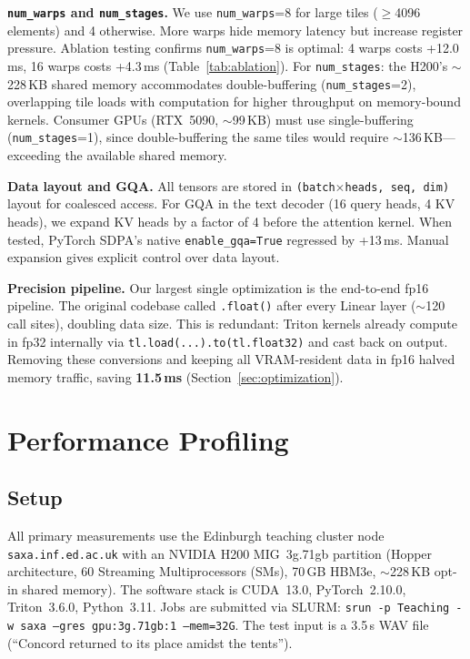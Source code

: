 \documentclass{article}
\begin{document}
\textbf{\texttt{num\_warps} and \texttt{num\_stages}.}
We use \texttt{num\_warps}=8 for large tiles ($\geq$4096 elements) and 4 otherwise.  More warps hide memory latency but increase register pressure.
Ablation testing confirms \texttt{num\_warps}=8 is optimal: 4 warps costs +12.0\,ms, 16 warps costs +4.3\,ms (Table~\ref{tab:ablation}).
For \texttt{num\_stages}: the H200's $\sim$228\,KB shared memory accommodates double-buffering (\texttt{num\_stages}=2), overlapping tile loads with computation for higher throughput on memory-bound kernels.  Consumer GPUs (RTX~5090, $\sim$99\,KB) must use single-buffering (\texttt{num\_stages}=1), since double-buffering the same tiles would require $\sim$136\,KB---exceeding the available shared memory.

\textbf{Data layout and GQA.}
All tensors are stored in \texttt{(batch$\times$heads, seq, dim)} layout for coalesced access.  For GQA in the text decoder (16 query heads, 4 KV heads), we expand KV heads by a factor of 4 before the attention kernel.  When tested, PyTorch SDPA's native \texttt{enable\_gqa=True} regressed by +13\,ms. Manual expansion gives explicit control over data layout.

\textbf{Precision pipeline.}
Our largest single optimization is the end-to-end fp16 pipeline.
The original codebase called \texttt{.float()} after every Linear layer ($\sim$120 call sites), doubling data size.  This is redundant: Triton kernels already compute in fp32 internally via \texttt{tl.load(...).to(tl.float32)} and cast back on output.
Removing these conversions and keeping all VRAM-resident data in fp16 halved memory traffic, saving \textbf{11.5\,ms} (Section~\ref{sec:optimization}).

\section{Performance Profiling}\label{sec:profiling}

\subsection{Setup}

All primary measurements use the Edinburgh teaching cluster node \texttt{saxa.inf.ed.ac.uk} with an NVIDIA H200 MIG~3g.71gb partition (Hopper architecture, 60 Streaming Multiprocessors (SMs), 70\,GB HBM3e, $\sim$228\,KB opt-in shared memory).
The software stack is CUDA~13.0, PyTorch~2.10.0, Triton~3.6.0, Python~3.11.
Jobs are submitted via SLURM: \texttt{srun -p Teaching -w saxa --gres gpu:3g.71gb:1 --mem=32G}.
The test input is a 3.5\,s WAV file (``Concord returned to its place amidst the tents'').
\end{document}
